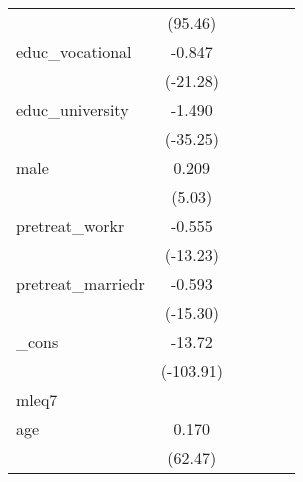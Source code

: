 {\begin{tabular}{l*{5}{c}}
            &     (95.46)         &                     &                     &                     &                     \\
[1em]
educ\_vocational&      -0.847\sym{***}&                     &                     &                     &                     \\
            &    (-21.28)         &                     &                     &                     &                     \\
[1em]
educ\_university&      -1.490\sym{***}&                     &                     &                     &                     \\
            &    (-35.25)         &                     &                     &                     &                     \\
[1em]
male        &       0.209\sym{***}&                     &                     &                     &                     \\
            &      (5.03)         &                     &                     &                     &                     \\
[1em]
pretreat\_workr&      -0.555\sym{***}&                     &                     &                     &                     \\
            &    (-13.23)         &                     &                     &                     &                     \\
[1em]
pretreat\_marriedr&      -0.593\sym{***}&                     &                     &                     &                     \\
            &    (-15.30)         &                     &                     &                     &                     \\
[1em]
\_cons      &      -13.72\sym{***}&                     &                     &                     &                     \\
            &   (-103.91)         &                     &                     &                     &                     \\
\hline
mleq7       &                     &                     &                     &                     &                     \\
age         &       0.170\sym{***}&                     &                     &                     &                     \\
            &     (62.47)         &                     &                     &                     &                     \\

\end{tabular}}
